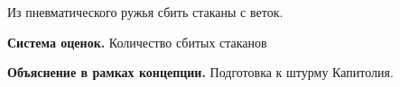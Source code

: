 
\par Из пневматического ружья сбить стаканы с веток.

\par \textbf{Система оценок.} Количество сбитых стаканов

\par \textbf{Объяснение в рамках концепции.} Подготовка к штурму Капитолия.